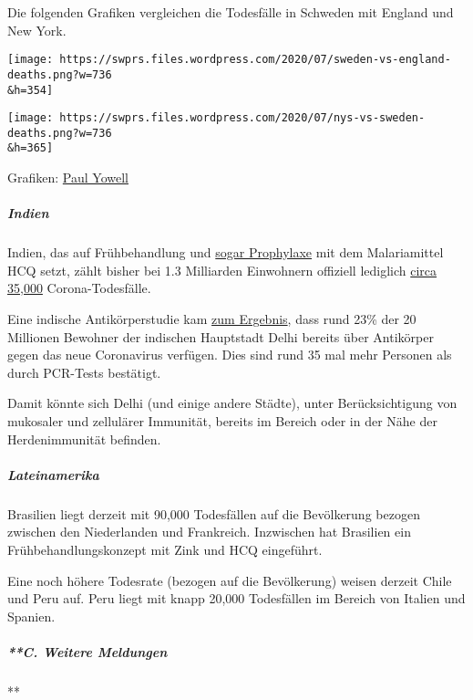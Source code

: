 Die folgenden Grafiken vergleichen die Todesfälle in Schweden mit
England und New York.

\texttt{[image: https://swprs.files.wordpress.com/2020/07/sweden-vs-england-deaths.png?w=736\\\&h=354]}

\texttt{[image: https://swprs.files.wordpress.com/2020/07/nys-vs-sweden-deaths.png?w=736\\\&h=365]}

Grafiken:
\href{https://twitter.com/pwyowell/status/1283504629393895425}{Paul
Yowell}

\hypertarget{indien}{%
\subparagraph{\texorpdfstring{\textbf{Indien}}{Indien}}\label{indien}}

Indien, das auf Frühbehandlung und
\href{https://health.economictimes.indiatimes.com/news/diagnostics/hcq-beneficial-as-preventive-drug-sms-doctors-told-icmr/76464620}{sogar
Prophylaxe} mit dem Malariamittel HCQ setzt, zählt bisher bei 1.3
Milliarden Einwohnern offiziell lediglich
\href{https://en.wikipedia.org/wiki/COVID-19_pandemic_in_India}{circa
35,000} Corona-Todesfälle.

Eine indische Antikörperstudie kam
\href{https://www.telegraphindia.com/india/covid-infected-and-cured-undetected-in-delhi/cid/1787002}{zum
Ergebnis}, dass rund 23\% der 20 Millionen Bewohner der indischen
Hauptstadt Delhi bereits über Antikörper gegen das neue Coronavirus
verfügen. Dies sind rund 35 mal mehr Personen als durch PCR-Tests
bestätigt.

Damit könnte sich Delhi (und einige andere Städte), unter
Berücksichtigung von mukosaler und zellulärer Immunität, bereits im
Bereich oder in der Nähe der Herdenimmunität befinden.

\hypertarget{lateinamerika}{%
\subparagraph{\texorpdfstring{\textbf{Lateinamerika}}{Lateinamerika}}\label{lateinamerika}}

Brasilien liegt derzeit mit 90,000 Todesfällen auf die Bevölkerung
bezogen zwischen den Niederlanden und Frankreich. Inzwischen hat
Brasilien ein Frühbehandlungskonzept mit Zink und HCQ eingeführt.

Eine noch höhere Todesrate (bezogen auf die Bevölkerung) weisen derzeit
Chile und Peru auf. Peru liegt mit knapp 20,000 Todesfällen im Bereich
von Italien und Spanien.

\hypertarget{c-weitere-meldungen}{%
\subparagraph{**C. Weitere Meldungen}\label{c-weitere-meldungen}}

**

